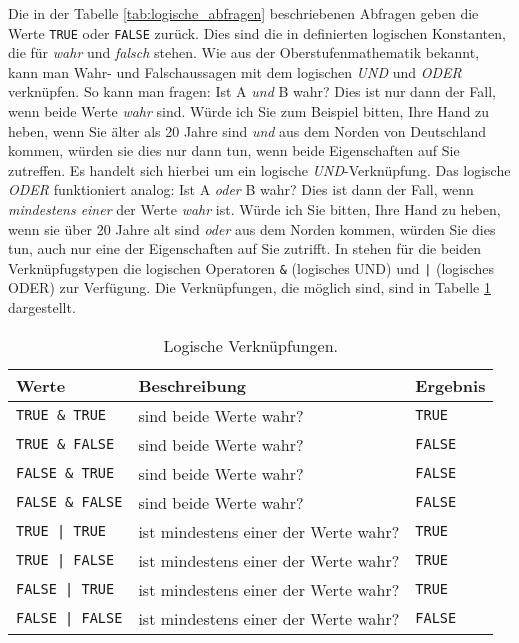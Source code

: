 Die in der Tabelle \ref{tab:logische_abfragen} beschriebenen Abfragen geben die Werte \verb!TRUE! oder \verb!FALSE! zurück. Dies sind die in \R{} definierten logischen Konstanten, die für \emph{wahr} und \emph{falsch} stehen. Wie aus der Oberstufenmathematik bekannt, kann man Wahr- und Falschaussagen mit dem logischen \emph{UND} und \emph{ODER} verknüpfen. So kann man fragen: Ist A \emph{und} B wahr? Dies ist nur dann der Fall, wenn beide Werte \emph{wahr} sind. Würde ich Sie zum Beispiel bitten, Ihre Hand zu heben, wenn Sie älter als 20 Jahre sind \emph{und} aus dem Norden von Deutschland kommen, würden sie dies nur dann tun, wenn beide Eigenschaften auf Sie zutreffen. Es handelt sich hierbei um ein logische \emph{UND}-Verknüpfung. Das logische \emph{ODER} funktioniert analog: Ist A \emph{oder} B wahr? Dies ist dann der Fall, wenn \emph{mindestens einer} der Werte \emph{wahr} ist. Würde ich Sie bitten, Ihre Hand zu heben, wenn sie über 20 Jahre alt sind \emph{oder} aus dem Norden kommen, würden Sie dies tun, auch nur eine der Eigenschaften auf Sie zutrifft. In \R{} stehen für die beiden Verknüpfugstypen die logischen Operatoren \verb!&! (logisches UND) und \verb!|! (logisches ODER) zur Verfügung. Die Verknüpfungen, die möglich sind, sind in Tabelle \ref{tab:logische_verknuepfungen} dargestellt.

\begin{table}[h]
  \centering
  \caption{Logische Verknüpfungen.}
  \label{tab:logische_verknuepfungen}
\begin{small}
\begin{tabular}{lll}
\hline
Werte & Beschreibung  & Ergebnis    \tabularnewline
\hline
\verb!TRUE & TRUE!	& sind beide Werte wahr? & \verb!TRUE!     \tabularnewline
\verb!TRUE & FALSE!	& sind beide Werte wahr? & \verb!FALSE!     \tabularnewline
\verb!FALSE & TRUE!	& sind beide Werte wahr? & \verb!FALSE!     \tabularnewline
\verb!FALSE & FALSE!	& sind beide Werte wahr? & \verb!FALSE!     \tabularnewline
\verb!TRUE | TRUE!	& ist mindestens einer der Werte wahr? & \verb!TRUE!     \tabularnewline
\verb!TRUE | FALSE!	& ist mindestens einer der Werte wahr? & \verb!TRUE!     \tabularnewline 
\verb!FALSE | TRUE!	& ist mindestens einer der Werte wahr? & \verb!TRUE!     \tabularnewline 
\verb!FALSE | FALSE!	& ist mindestens einer der Werte wahr? & \verb!FALSE!     \tabularnewline 
\hline
\end{tabular}
\end{small}
\end{table}

